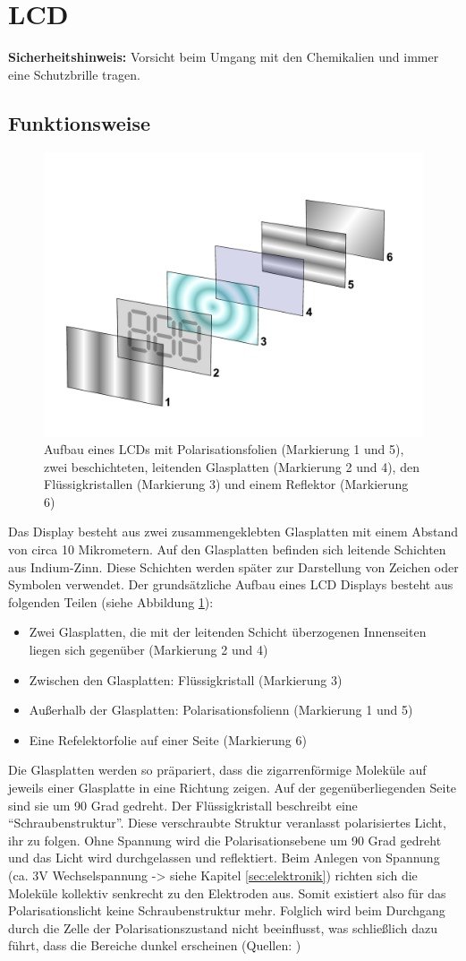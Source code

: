 \section{LCD}
\textbf{Sicherheitshinweis:} Vorsicht beim Umgang mit den Chemikalien und immer eine Schutzbrille tragen.
\subsection{Funktionsweise}

\begin{figure}[t]
  \centering
  \includegraphics[height=0.3\textwidth, keepaspectratio]{Bilder/LCD_layers}
  \caption{Aufbau eines LCDs mit Polarisationsfolien (Markierung 1 und 5), zwei beschichteten, leitenden Glasplatten (Markierung 2 und 4), den Flüssigkristallen (Markierung 3) und einem Reflektor (Markierung 6)}
  \label{lcdaufbau}
\end{figure}

Das Display besteht aus zwei zusammengeklebten Glasplatten mit einem Abstand von circa 10 Mikrometern. Auf den Glasplatten befinden sich leitende Schichten aus Indium-Zinn. Diese Schichten werden später zur Darstellung von Zeichen oder Symbolen verwendet. Der grundsätzliche Aufbau eines LCD Displays besteht aus folgenden Teilen (siehe Abbildung \ref{lcdaufbau}):
\begin{itemize}
\item Zwei Glasplatten, die mit der leitenden Schicht überzogenen Innenseiten liegen sich gegenüber (Markierung 2 und 4)
\item Zwischen den Glasplatten: Flüssigkristall (Markierung 3)
\item Außerhalb der Glasplatten: Polarisationsfolienn (Markierung 1 und 5)
\item Eine Refelektorfolie auf einer Seite (Markierung 6)
\end{itemize}
Die Glasplatten werden so präpariert, dass die zigarrenförmige Moleküle auf jeweils einer Glasplatte in eine Richtung zeigen. Auf der gegenüberliegenden Seite sind sie um 90 Grad gedreht. Der Flüssigkristall beschreibt eine “Schraubenstruktur”. Diese verschraubte Struktur veranlasst polarisiertes Licht, ihr zu folgen. Ohne Spannung wird die Polarisationsebene um 90 Grad gedreht und das Licht wird durchgelassen und reflektiert. Beim Anlegen von Spannung (ca. 3V Wechselspannung -> siehe Kapitel \ref{sec:elektronik}) richten sich die Moleküle kollektiv senkrecht zu den Elektroden aus. Somit existiert also für das Polarisationslicht keine Schraubenstruktur mehr. Folglich wird beim Durchgang durch die Zelle der Polarisationszustand nicht beeinflusst, was schließlich dazu führt, dass die Bereiche dunkel erscheinen (Quellen: \cite[Bauanleitung]{Bauanleitung} \cite[LCD Aufbau und Funktion]{aufbau_und_funktion})


